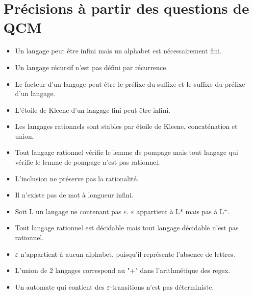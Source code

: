 \documentclass{article}
\begin{document}
\section{Précisions à partir des questions de QCM}
\begin{itemize}
	\item Un langage peut être infini mais un alphabet est nécessairement fini.
	\item Un langage récursif n'est pas défini par récurrence.
	\item Le facteur d'un langage peut être le préfixe du suffixe et le suffixe du préfixe d'un langage.
	\item L'étoile de Kleene d'un langage fini peut être infini.
	\item Les langages rationnels sont stables par étoile de Kleene, concaténation et union.
	\item Tout langage rationnel vérifie le lemme de pompage mais tout langage qui vérifie le lemme de pompage n'est pas rationnel.
	\item L'inclusion ne préserve pas la rationalité.
	\item Il n'existe pas de mot à longueur infini.
    \item Soit L un langage ne contenant pas $\varepsilon$. $\varepsilon$ appartient à L* mais pas à L$^{+}$.
    \item Tout langage rationnel est décidable mais tout langage décidable n'est pas rationnel.
    \item $\varepsilon$ n'appartient à aucun alphabet, puisqu'il représente l'absence de lettres.
    \item L'union de 2 langages correspond au "+" dans l'arithmétique des regex.
    \item Un automate qui contient des $\varepsilon$-transitions n'est pas déterministe.
\end{itemize}
\end{document}
